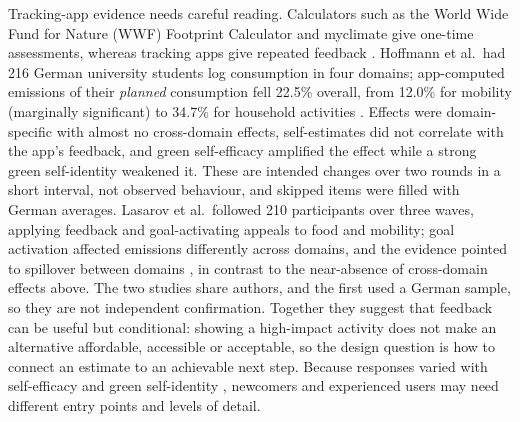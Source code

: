\documentclass[10pt,a4paper,twocolumn]{article}
\begin{document}
Tracking-app evidence needs careful reading. Calculators such as the World Wide Fund for Nature (WWF) Footprint Calculator and myclimate give one-time assessments, whereas tracking apps give repeated feedback \cite{hoffmann2024}. Hoffmann et al.\ had 216 German university students log consumption in four domains; app-computed emissions of their \emph{planned} consumption fell 22.5\% overall, from 12.0\% for mobility (marginally significant) to 34.7\% for household activities \cite{hoffmann2024}. Effects were domain-specific with almost no cross-domain effects, self-estimates did not correlate with the app's feedback, and green self-efficacy amplified the effect while a strong green self-identity weakened it. These are intended changes over two rounds in a short interval, not observed behaviour, and skipped items were filled with German averages. Lasarov et al.\ followed 210 participants over three waves, applying feedback and goal-activating appeals to food and mobility; goal activation affected emissions differently across domains, and the evidence pointed to spillover between domains \cite{lasarov2024}, in contrast to the near-absence of cross-domain effects above. The two studies share authors, and the first used a German sample, so they are not independent confirmation. Together they suggest that feedback can be useful but conditional: showing a high-impact activity does not make an alternative affordable, accessible or acceptable, so the design question is how to connect an estimate to an achievable next step. Because responses varied with self-efficacy and green self-identity \cite{hoffmann2024}, newcomers and experienced users may need different entry points and levels of detail.
\end{document}
